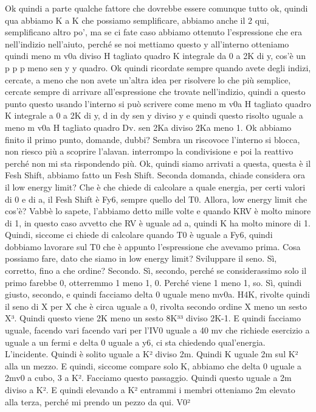 \begin{soluzione}
{   Ok quindi a parte qualche fattore che dovrebbe essere comunque tutto ok, quindi qua abbiamo K a K che possiamo semplificare, abbiamo anche il 2 qui, semplificano altro po', ma se ci fate caso abbiamo ottenuto l'espressione che era nell'indizio nell'aiuto, perché se noi mettiamo questo y all'interno otteniamo quindi meno m v0a diviso H tagliato quadro K integrale da 0 a 2K di y, cos'è un p p p meno sen y y quadro. Ok quindi ricordate sempre quando avete degli indizi, cercate, a meno che non avete un'altra idea per risolvere lo che più semplice, cercate sempre di arrivare all'espressione che trovate nell'indizio, quindi a questo punto questo usando l'interno si può scrivere come meno m v0a H tagliato quadro K integrale a 0 a 2K di y, d in dy sen y diviso y e quindi questo risolto uguale a meno m v0a H tagliato quadro Dv. sen 2Ka diviso 2Ka meno 1. Ok abbiamo finito il primo punto, domande, dubbi? Sembra un riscovoce l'interno si blocca, non riesco più a scoprire l'alavan. interrompo la condivisione e poi la reattivo perché non mi sta rispondendo più. Ok, quindi siamo arrivati a questa, questa è il Fesh Shift, abbiamo fatto un Fesh Shift. Seconda domanda, chiade considera ora il low energy limit? Che è che chiede di calcolare a quale energia, per certi valori di 0 e di a, il Fesh Shift è Fy6, sempre quello del T0. Allora, low energy limit che cos'è? Vabbè lo sapete, l'abbiamo detto mille volte e quando KRV è molto minore di 1, in questo caso avvetto che RV è uguale ad a, quindi K ha molto minore di 1. Quindi, siccome ci chiede di calcolare quando T0 è uguale a Fy6, quindi dobbiamo lavorare sul T0 che è appunto l'espressione che avevamo prima. Cosa possiamo fare, dato che siamo in low energy limit? Sviluppare il seno. Sì, corretto, fino a che ordine? Secondo. Sì, secondo, perché se considerassimo solo il primo farebbe 0, otterremmo 1 meno 1, 0. Perché viene 1 meno 1, so. Sì, quindi giusto, secondo, e quindi facciamo delta 0 uguale meno mv0a. H4K, rivolte quindi il seno di X per X che è circa uguale a 0, rivolta secondo ordine X meno un sesto X³. Quindi questo viene 2K meno un sesto 8K³³ diviso 2K-1. E quindi facciamo uguale, facendo vari facendo vari per l'IV0 uguale a 40 mv che richiede esercizio a uguale a un fermi e delta 0 uguale a y6, ci sta chiedendo qual'energia. L'incidente. Quindi è solito uguale a K² diviso 2m. Quindi K uguale 2m sul K² alla un mezzo. E quindi, siccome compare solo K, abbiamo che delta 0 uguale a 2mv0 a cubo, 3 a K². Facciamo questo passaggio. Quindi questo uguale a 2m diviso a K². E quindi elevando a K² entrammi i membri otteniamo 2m elevato alla terza, perché mi prendo un pezzo da qui. V0²
   
}
\end{soluzione}
